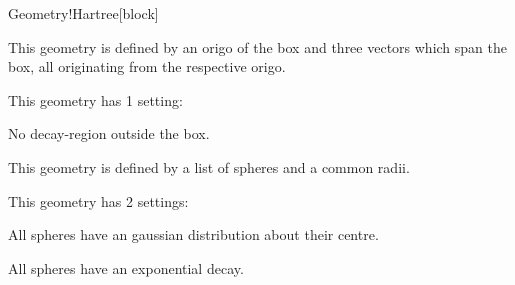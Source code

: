 \begin{fdfentry}{Geometry!Hartree}[block]
\begin{fdfoptions}
    \option[Box]%

    This geometry is defined by an origo of the box and three vectors
    which span the box, all originating from the respective origo.

    This geometry has 1 setting:
    \begin{fdfoptions}
      \option[delta] %
      No decay-region outside the box.
      
    \end{fdfoptions}


    \option[Spheres]%
    
    This geometry is defined by a list of spheres and a common radii.
    
    This geometry has 2 settings:
    \begin{fdfoptions}
      
      \option[gauss] %
      All spheres have an gaussian distribution about their centre.
      
      \option[exp] %
      All spheres have an exponential decay.
      
    \end{fdfoptions}
    
  \end{fdfoptions}


\end{fdfentry}
